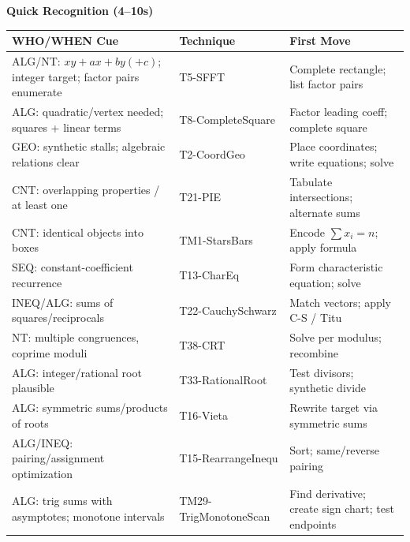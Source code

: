 \documentclass[12pt]{article}
\begin{document}
\begin{tcolorbox}[colback=blue!5!white,colframe=blue!75!black,title={Use this as a speed index; confirm WHEN conditions before executing}]
\vspace{2mm}
\textbf{Quick Recognition (4--10s)}
\begin{tabularx}{\textwidth}{|p{}|p{}|X|}
\hline
\textbf{WHO/WHEN Cue} & \textbf{Technique} & \textbf{First Move} \\
\hline
ALG/NT: $xy+ax+by(+c)$; integer target; factor pairs enumerate & T5-SFFT & Complete rectangle; list factor pairs \\
\hline
ALG: quadratic/vertex needed; squares + linear terms & T8-CompleteSquare & Factor leading coeff; complete square \\
\hline
GEO: synthetic stalls; algebraic relations clear & T2-CoordGeo & Place coordinates; write equations; solve \\
\hline
CNT: overlapping properties / at least one & T21-PIE & Tabulate intersections; alternate sums \\
\hline
CNT: identical objects into boxes & TM1-StarsBars & Encode $\sum x_i=n$; apply formula \\
\hline
SEQ: constant-coefficient recurrence & T13-CharEq & Form characteristic equation; solve \\
\hline
INEQ/ALG: sums of squares/reciprocals & T22-CauchySchwarz & Match vectors; apply C-S / Titu \\
\hline
NT: multiple congruences, coprime moduli & T38-CRT & Solve per modulus; recombine \\
\hline
ALG: integer/rational root plausible & T33-RationalRoot & Test divisors; synthetic divide \\
\hline
ALG: symmetric sums/products of roots & T16-Vieta & Rewrite target via symmetric sums \\
\hline
ALG/INEQ: pairing/assignment optimization & T15-RearrangeInequ & Sort; same/reverse pairing \\
\hline
ALG: trig sums with asymptotes; monotone intervals & TM29-TrigMonotoneScan & Find derivative; create sign chart; test endpoints \\
\hline
\end{tabularx}


\end{tcolorbox}
\end{document}
